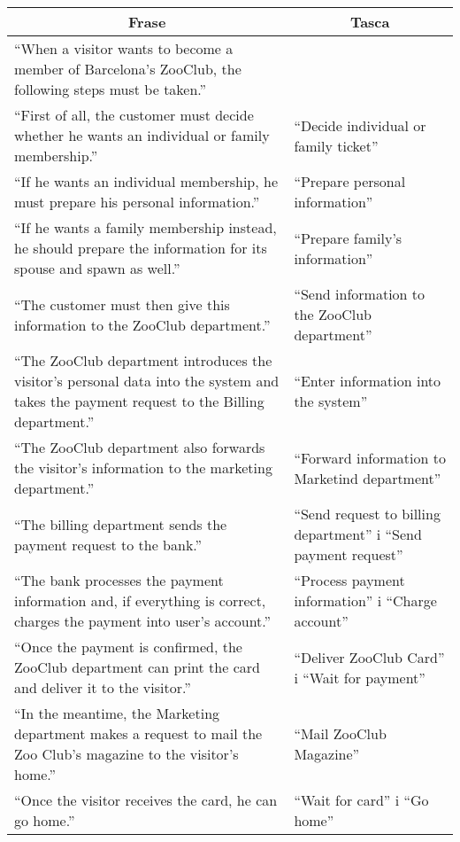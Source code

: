\begin{center}
\begin{tabular}{|p{}|p{}|}
    \hline
    \multicolumn{1}{|c}{\textbf{Frase}} & \multicolumn{1}{|c|}{\textbf{Tasca}} \\ \hline\hline
    ``When a visitor wants to become a member of Barcelona's ZooClub, the following steps must be taken.'' & \\\hline
    ``First of all, the customer must decide whether he wants an individual or family membership.'' & ``Decide individual or family ticket''\\\hline
    ``If he wants an individual membership, he must prepare his personal information.'' & ``Prepare personal information'' \\\hline
    ``If he wants a family membership instead, he should prepare the information for its spouse and spawn as well.'' & ``Prepare family's information'' \\\hline
    ``The customer must then give this information to the ZooClub department.'' & ``Send information to the ZooClub department'' \\\hline
    ``The ZooClub department introduces the visitor's personal data into the system and takes the payment request to the Billing department.'' & ``Enter information into the system'' \\\hline
    ``The ZooClub department also forwards the visitor's information to the marketing department.'' & ``Forward information to Marketind department'' \\\hline
    ``The billing department sends the payment request to the bank.'' &``Send request to billing department'' i ``Send payment request'' \\\hline
    ``The bank processes the payment information and, if everything is correct, charges the payment into user's account.'' & ``Process payment information'' i  ``Charge account'' \\\hline
    ``Once the payment is confirmed, the ZooClub department can print the card and deliver it to the visitor.'' & ``Deliver ZooClub Card'' i ``Wait for payment''\\\hline
    ``In the meantime, the Marketing department makes a request to mail the Zoo Club's magazine to the visitor's home.'' & ``Mail ZooClub Magazine'' \\\hline
    ``Once the visitor receives the card, he can go home.'' & ``Wait for card'' i ``Go home'' \\\hline
\end{tabular}
\end{center}


